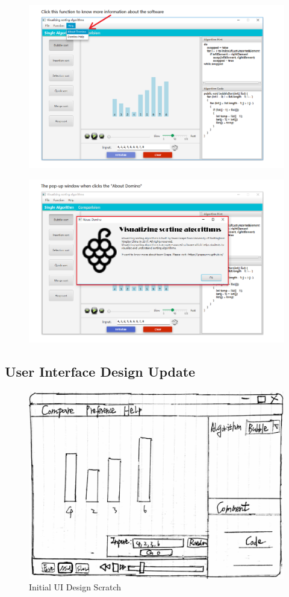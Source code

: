 \documentclass[paper=a4, fontsize=11pt,twoside]{scrartcl}		%
\begin{document}
\begin{figure}[htbp]
\centering
\includegraphics[width=1\textwidth]{user_menu/16.png}
\label{user_menu16}
\end{figure}
\begin{figure}[htbp]
\centering
\includegraphics[width=1\textwidth]{user_menu/17.png}
\label{user_menu17}
\end{figure}


\subsection{User Interface Design Update}

\begin{figure}[htbp]
\centering
\includegraphics[width=.6\textwidth,height=.4\textwidth]{low-fidelity_prototype.jpg}
\caption{Initial UI Design Scratch}
\label{ui-design}
\end{figure}
\end{document}
